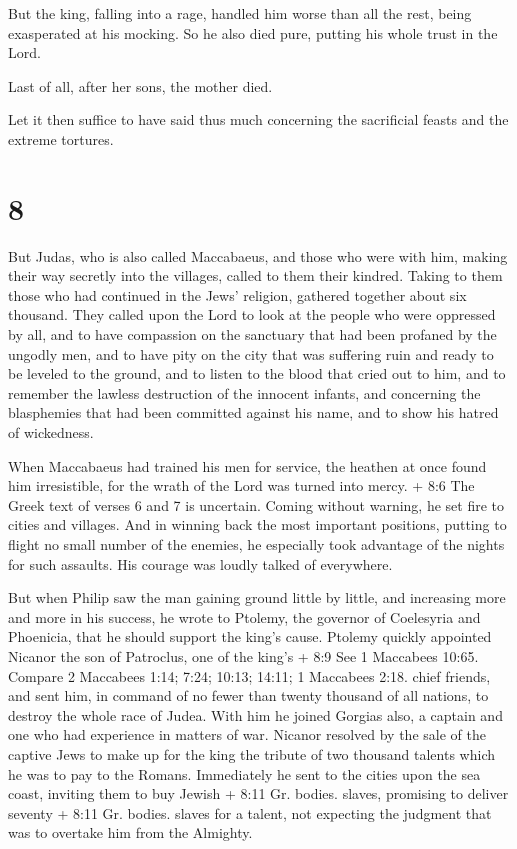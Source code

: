  But the king, falling into a rage, handled him worse than
all the rest, being exasperated at his mocking.  So he also
died pure, putting his whole trust in the Lord.

 Last of all, after her sons, the mother died.

 Let it then suffice to have said thus much concerning the
sacrificial feasts and the extreme tortures.

\hypertarget{section-6}{%
\section{8}\label{section-6}}

 But Judas, who is also called Maccabaeus, and those who
were with him, making their way secretly into the villages, called to
them their kindred. Taking to them those who had continued in the Jews'
religion, gathered together about six thousand.  They called
upon the Lord to look at the people who were oppressed by all, and to
have compassion on the sanctuary that had been profaned by the ungodly
men,  and to have pity on the city that was suffering ruin
and ready to be leveled to the ground, and to listen to the blood that
cried out to him,  and to remember the lawless destruction
of the innocent infants, and concerning the blasphemies that had been
committed against his name, and to show his hatred of wickedness.

 When Maccabaeus had trained his men for service, the
heathen at once found him irresistible, for the wrath of the Lord was
turned into mercy.  + 8:6 The Greek text of verses 6 and 7
is uncertain. Coming without warning, he set fire to cities and
villages. And in winning back the most important positions, putting to
flight no small number of the enemies,  he especially took
advantage of the nights for such assaults. His courage was loudly talked
of everywhere.

 But when Philip saw the man gaining ground little by
little, and increasing more and more in his success, he wrote to
Ptolemy, the governor of Coelesyria and Phoenicia, that he should
support the king's cause.  Ptolemy quickly appointed Nicanor
the son of Patroclus, one of the king's + 8:9 See 1 Maccabees 10:65.
Compare 2 Maccabees 1:14; 7:24; 10:13; 14:11; 1 Maccabees 2:18. chief
friends, and sent him, in command of no fewer than twenty thousand of
all nations, to destroy the whole race of Judea. With him he joined
Gorgias also, a captain and one who had experience in matters of war.
 Nicanor resolved by the sale of the captive Jews to make
up for the king the tribute of two thousand talents which he was to pay
to the Romans.  Immediately he sent to the cities upon the
sea coast, inviting them to buy Jewish + 8:11 Gr. bodies. slaves,
promising to deliver seventy + 8:11 Gr. bodies. slaves for a talent, not
expecting the judgment that was to overtake him from the Almighty.

